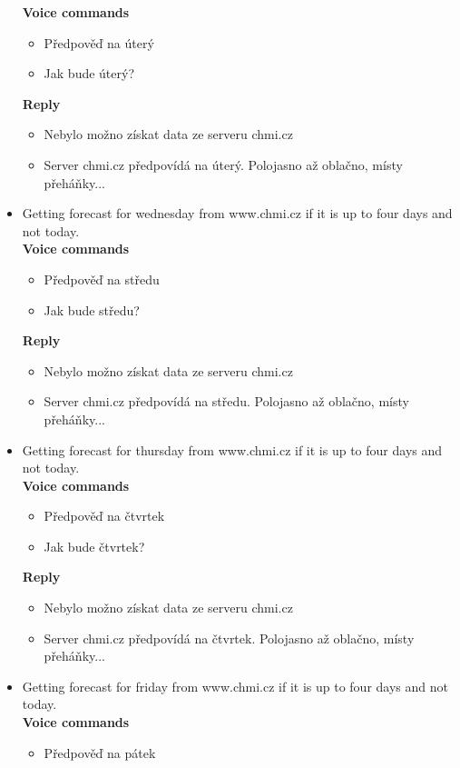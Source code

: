 \begin{itemize}
    \textbf{Voice commands}
    \begin{itemize}
        \item Předpověď na úterý
        \item Jak bude úterý?
    \end{itemize}
    \textbf{Reply}
    \begin{itemize}
        \item Nebylo možno získat data ze serveru chmi.cz
        \item Server chmi.cz předpovídá na úterý. Polojasno až oblačno, místy přeháňky...
    \end{itemize}
    \item Getting forecast for wednesday from www.chmi.cz if it is up to four days and not today.\\
    \textbf{Voice commands}
    \begin{itemize}
        \item Předpověď na středu
        \item Jak bude středu?
    \end{itemize}
    \textbf{Reply}
    \begin{itemize}
        \item Nebylo možno získat data ze serveru chmi.cz
        \item Server chmi.cz předpovídá na středu. Polojasno až oblačno, místy přeháňky...
    \end{itemize}
    \item Getting forecast for thursday from www.chmi.cz if it is up to four days and not today.\\
    \textbf{Voice commands}
    \begin{itemize}
        \item Předpověď na čtvrtek
        \item Jak bude čtvrtek?
    \end{itemize}
    \textbf{Reply}
    \begin{itemize}
        \item Nebylo možno získat data ze serveru chmi.cz
        \item Server chmi.cz předpovídá na čtvrtek. Polojasno až oblačno, místy přeháňky...
    \end{itemize}
    \item Getting forecast for friday from www.chmi.cz if it is up to four days and not today.\\
    \textbf{Voice commands}
    \begin{itemize}
        \item Předpověď na pátek

\end{itemize}
\end{itemize}
